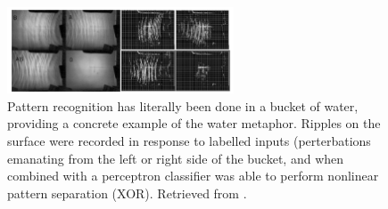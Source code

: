 \begin{figure}[h]
\centering
\includegraphics[width=0.6\textwidth]{images/BucketPatternRecognition.png}
\caption[Fernando, Chrisantha and Sojakka, Sampsa.]{Pattern recognition has literally been done in a bucket of water, providing a concrete example of the water metaphor. Ripples on the surface were recorded in response to labelled inputs (perterbations emanating from the left or right side of the bucket, and when combined with a perceptron classifier was able  to perform nonlinear pattern separation (XOR). Retrieved from \cite{fernando2003pattern}. }
\label{F:bucketclassifier}
\end{figure}

